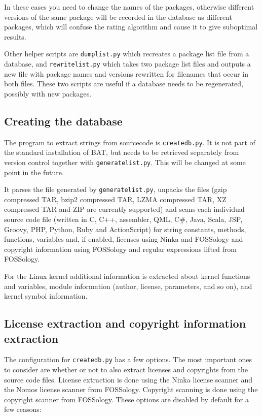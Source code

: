 \documentclass[10pt,a4paper]{article}
\begin{document}
In these cases you need to change the names of the packages, otherwise
different versions of the same package will be recorded in the database as
different packages, which will confuse the rating algorithm and cause it to
give suboptimal results.

Other helper scripts are \texttt{dumplist.py} which recreates a package list
file from a database, and \texttt{rewritelist.py} which takes two package list
files and outputs a new file with package names and versions rewritten for
filenames that occur in both files. These two scripts are useful if a database
needs to be regenerated, possibly with new packages.

\subsection{Creating the database}

The program to extract strings from sourcecode is \texttt{createdb.py}. It is
not part of the standard installation of BAT, but needs to be retrieved
separately from version control together with \texttt{generatelist.py}. This
will be changed at some point in the future.

It parses the file generated by \texttt{generatelist.py}, unpacks the files
(gzip compressed TAR, bzip2 compressed TAR, LZMA compressed TAR, XZ compressed
TAR and ZIP are currently supported) and scans each individual source code file
(written in C, C++, assembler, QML, C\#, Java, Scala, JSP, Groovy, PHP, Python,
Ruby and ActionScript) for string constants, methods, functions, variables and,
if enabled, licenses using Ninka and FOSSology and copyright information using
FOSSology and regular expressions lifted from FOSSology.

For the Linux kernel additional information is extracted about kernel functions
and variables, module information (author, license, parameters, and so on),
and kernel symbol information.

\subsection{License extraction and copyright information extraction}

The configuration for \texttt{createdb.py} has a few options. The most important
ones to consider are whether or not to also extract licenses and copyrights from
the source code files.  License extraction is done using the Ninka license
scanner and the Nomos license scanner from FOSSology. Copyright scanning is done
using the copyright scanner from FOSSology. These options are disabled
by default for a few reasons:
\end{document}
